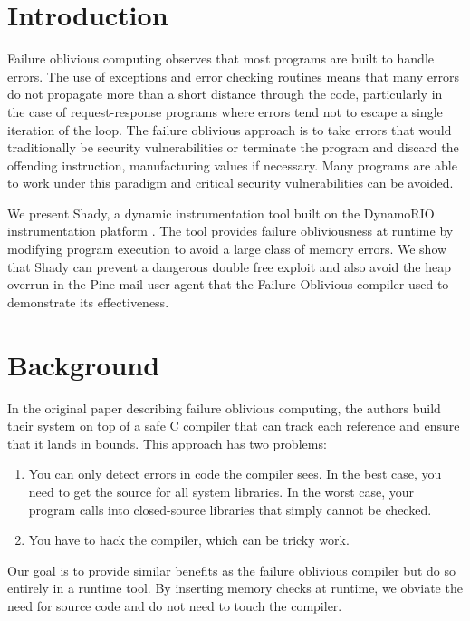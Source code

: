 \documentclass{article}
\title{\thetitle}
\author{\theauthor}
\begin{document}
\maketitle

\section{Introduction} %
\label{sec:Introduction}

Failure oblivious computing \cite{Rinard04enhancingserver} observes that most programs are built to handle errors.  The use of exceptions and error checking routines means that many errors do not propagate more than a short distance through the code, particularly in the case of request-response programs where errors tend not to escape a single iteration of the loop.  The failure oblivious approach is to take errors that would traditionally be security vulnerabilities or terminate the program and discard the offending instruction, manufacturing values if necessary.  Many programs are able to work under this paradigm and critical security vulnerabilities can be avoided.

We present Shady, a dynamic instrumentation tool built on the DynamoRIO instrumentation platform \cite{Bruening04efficient}. The tool provides failure obliviousness at runtime by modifying program execution to avoid a large class of memory errors. We show that Shady can prevent a dangerous double free exploit and also avoid the heap overrun in the Pine mail user agent that the Failure Oblivious compiler used to demonstrate its effectiveness.

\section{Background} %
\label{sec:Background}


In the original paper describing failure oblivious computing, the authors build their system on top of a safe C compiler that can track each reference and ensure that it lands in bounds. This approach has two problems:
\begin{enumerate}
\item You can only detect errors in code the compiler sees. In the best case, you need to get the source for all system libraries. In the worst case, your program calls into closed-source libraries that simply cannot be checked.
\item You have to hack the compiler, which can be tricky work.
\end{enumerate}
Our goal is to provide similar benefits as the failure oblivious compiler but do so entirely in a runtime tool. By inserting memory checks at runtime, we obviate the need for source code and do not need to touch the compiler.
\end{document}
